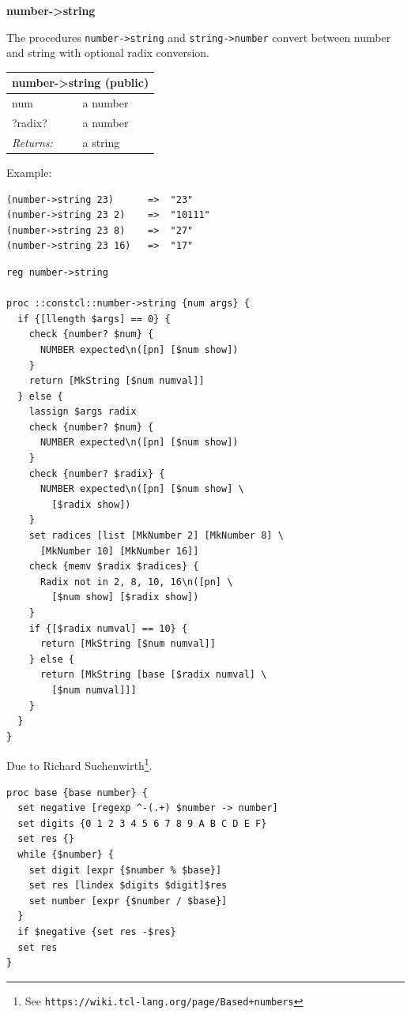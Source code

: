 \documentclass[twoside,9pt]{report}
\begin{document}
\textbf{number->string}


The procedures \texttt{number->string} and \texttt{string->number} convert between number and string with optional radix conversion.

\begin{tabular}{ |l l| }
\hline
\multicolumn{2}{|l|}{number->string (public)} \\
\hline
num & a number \\
?radix? & a number \\
\textit{Returns:} & a string \\
\hline
\end{tabular}


Example:

\noindent\makebox[\linewidth]{\rule{\linewidth}{0.4pt}}
\begin{lstlisting}
(number->string 23)      =>  "23"
(number->string 23 2)    =>  "10111"
(number->string 23 8)    =>  "27"
(number->string 23 16)   =>  "17"
\end{lstlisting}
\noindent\makebox[\linewidth]{\rule{\linewidth}{0.4pt}}
\noindent\makebox[\linewidth]{\rule{\linewidth}{0.4pt}}
\begin{lstlisting}
reg number->string
 
proc ::constcl::number->string {num args} {
  if {[llength $args] == 0} {
    check {number? $num} {
      NUMBER expected\n([pn] [$num show])
    }
    return [MkString [$num numval]]
  } else {
    lassign $args radix
    check {number? $num} {
      NUMBER expected\n([pn] [$num show])
    }
    check {number? $radix} {
      NUMBER expected\n([pn] [$num show] \
        [$radix show])
    }
    set radices [list [MkNumber 2] [MkNumber 8] \
      [MkNumber 10] [MkNumber 16]]
    check {memv $radix $radices} {
      Radix not in 2, 8, 10, 16\n([pn] \
        [$num show] [$radix show])
    }
    if {[$radix numval] == 10} {
      return [MkString [$num numval]]
    } else {
      return [MkString [base [$radix numval] \
        [$num numval]]]
    }
  }
}
\end{lstlisting}
\noindent\makebox[\linewidth]{\rule{\linewidth}{0.4pt}}

Due to Richard Suchenwirth\footnote{See \texttt{https://wiki.tcl-lang.org/page/Based+numbers}}.

\noindent\makebox[\linewidth]{\rule{\linewidth}{0.4pt}}
\begin{lstlisting}
proc base {base number} {
  set negative [regexp ^-(.+) $number -> number]
  set digits {0 1 2 3 4 5 6 7 8 9 A B C D E F}
  set res {}
  while {$number} {
    set digit [expr {$number % $base}]
    set res [lindex $digits $digit]$res
    set number [expr {$number / $base}]
  }
  if $negative {set res -$res}
  set res
}
\end{lstlisting}
\noindent\makebox[\linewidth]{\rule{\linewidth}{0.4pt}}
\end{document}
